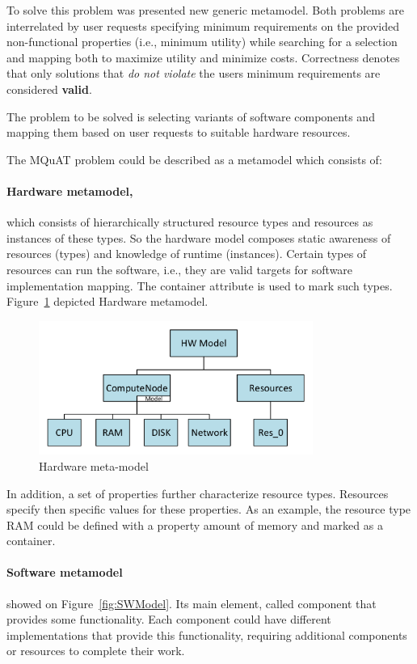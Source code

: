 To solve this problem was presented new generic metamodel. Both problems are interrelated by user requests specifying minimum requirements on the provided non-functional properties (i.e., minimum utility) while searching for a selection and mapping both to maximize utility and minimize costs. Correctness denotes that only solutions that \textit{do not violate} the users minimum requirements are considered \textbf{valid}.

The problem to be solved is selecting variants of software components and mapping them based on user requests to suitable hardware resources.

The MQuAT problem could be described as a metamodel which consists of:
\paragraph{Hardware metamodel,}which consists of hierarchically structured resource types and resources as instances of these types. So the hardware model composes static awareness of resources (types) and knowledge of runtime (instances). Certain types of resources can run the software, i.e., they are valid targets for software implementation mapping. The container attribute is used to mark such types. Figure~\ref{fig:HWmodel} depicted Hardware metamodel.

\begin{figure}
	\centering
	\includegraphics[width=0.8\textwidth]{images/HWModel.pdf}
	\caption[Hardware meta-model]{Hardware meta-model}
	\label{fig:HWmodel}
\end{figure}


In addition, a set of properties further characterize resource types. Resources specify then specific values for these properties. As an example, the resource type RAM could be defined with a property amount of memory and marked as a container.

\paragraph{Software metamodel} showed on Figure~\ref{fig:SWModel}. Its main element, called component that provides some functionality.
Each component could have different implementations that provide this functionality, requiring additional components or resources to complete their work. 

